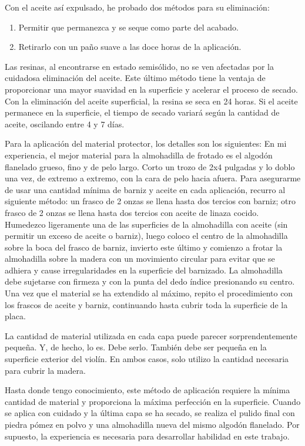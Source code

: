 \documentclass[12pt]{book}
\begin{document}
Con el aceite así expulsado, he probado dos métodos para su eliminación:
\begin{enumerate}
    \item Permitir que permanezca y se seque como parte del acabado.
    \item Retirarlo con un paño suave a las doce horas de la aplicación.
\end{enumerate}

Las resinas, al encontrarse en estado semisólido, no se ven afectadas por la cuidadosa eliminación del aceite. Este último método tiene la ventaja de proporcionar una mayor suavidad en la superficie y acelerar el proceso de secado. Con la eliminación del aceite superficial, la resina se seca en 24 horas. Si el aceite permanece en la superficie, el tiempo de secado variará según la cantidad de aceite, oscilando entre 4 y 7 días.

Para la aplicación del material protector, los detalles son los siguientes: En mi experiencia, el mejor material para la almohadilla de frotado es el algodón flanelado grueso, fino y de pelo largo. Corto un trozo de 2x4 pulgadas y lo doblo una vez, de extremo a extremo, con la cara de pelo hacia afuera. Para asegurarme de usar una cantidad mínima de barniz y aceite en cada aplicación, recurro al siguiente método: un frasco de 2 onzas se llena hasta dos tercios con barniz; otro frasco de 2 onzas se llena hasta dos tercios con aceite de linaza cocido. Humedezco ligeramente una de las superficies de la almohadilla con aceite (sin permitir un exceso de aceite o barniz), luego coloco el centro de la almohadilla sobre la boca del frasco de barniz, invierto este último y comienzo a frotar la almohadilla sobre la madera con un movimiento circular para evitar que se adhiera y cause irregularidades en la superficie del barnizado. La almohadilla debe sujetarse con firmeza y con la punta del dedo índice presionando su centro. Una vez que el material se ha extendido al máximo, repito el procedimiento con los frascos de aceite y barniz, continuando hasta cubrir toda la superficie de la placa.

La cantidad de material utilizada en cada capa puede parecer sorprendentemente pequeña. Y, de hecho, lo es. Debe serlo. También debe ser pequeña en la superficie exterior del violín. En ambos casos, solo utilizo la cantidad necesaria para cubrir la madera.

Hasta donde tengo conocimiento, este método de aplicación requiere la mínima cantidad de material y proporciona la máxima perfección en la superficie. Cuando se aplica con cuidado y la última capa se ha secado, se realiza el pulido final con piedra pómez en polvo y una almohadilla nueva del mismo algodón flanelado. Por supuesto, la experiencia es necesaria para desarrollar habilidad en este trabajo.
\end{document}
